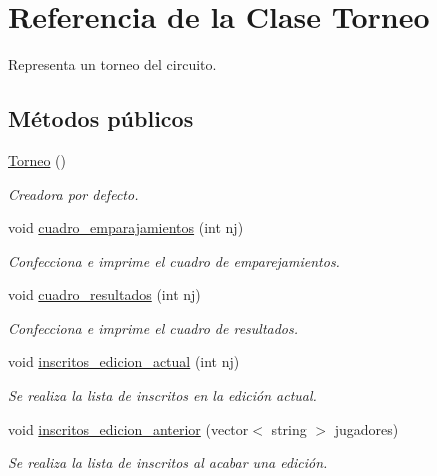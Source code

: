 \hypertarget{class_torneo}{}\section{Referencia de la Clase Torneo}
\label{class_torneo}


Representa un torneo del circuito.  


\subsection*{Métodos públicos}
\begin{DoxyCompactItemize}
\item 
\hyperlink{class_torneo_a7bf6d35a7ec8d0e13a0bed8deb8add3e}{Torneo} ()
\begin{DoxyCompactList}\small\item\em Creadora por defecto. \end{DoxyCompactList}\item 
void \hyperlink{class_torneo_a7a935f50cc04d337daaddad8adf9e9a2}{cuadro\+\_\+emparajamientos} (int nj)
\begin{DoxyCompactList}\small\item\em Confecciona e imprime el cuadro de emparejamientos. \end{DoxyCompactList}\item 
void \hyperlink{class_torneo_ab0e77986392e1b733fae7da2c335208c}{cuadro\+\_\+resultados} (int nj)
\begin{DoxyCompactList}\small\item\em Confecciona e imprime el cuadro de resultados. \end{DoxyCompactList}\item 
void \hyperlink{class_torneo_a2fcaaf52de27aca302d1341b70008f1e}{inscritos\+\_\+edicion\+\_\+actual} (int nj)
\begin{DoxyCompactList}\small\item\em Se realiza la lista de inscritos en la edición actual. \end{DoxyCompactList}\item 
void \hyperlink{class_torneo_ac1fd79d2aa1de8c3a3f29355b21c2ecb}{inscritos\+\_\+edicion\+\_\+anterior} (vector$<$ string $>$ jugadores)
\begin{DoxyCompactList}\small\item\em Se realiza la lista de inscritos al acabar una edición. \end{DoxyCompactList}\end{DoxyCompactItemize}


